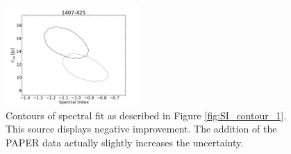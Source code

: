 \documentclass[preprint]{aastex}
\begin{document}
\begin{figure}[htbp]
\begin{center}
\includegraphics[width=2in]{plots/1407-425_SI_MCMC.png} %
\caption{Contours of spectral fit as described in Figure \ref{fig:SI_contour_1}. This source displays negative 
improvement. The addition of the PAPER data actually slightly increases the uncertainty.
\label{fig:SI_contour_bad}}
\end{center}
\end{figure}
\end{document}

